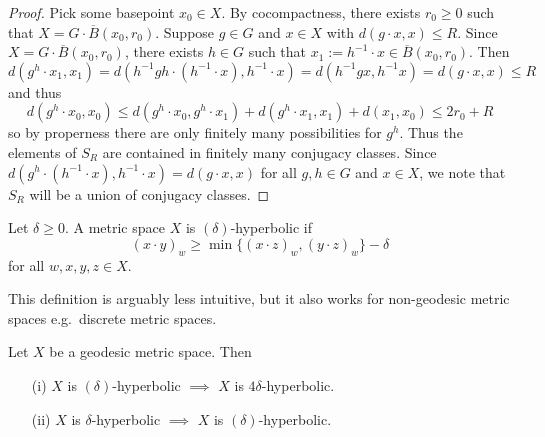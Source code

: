 \begin{proof}
    Pick some basepoint $x_0 \in X$.
    By cocompactness, there exists $r_0 \geq 0$ such that $X = G \cdot \overline{B}(x_0, r_0)$.
    Suppose $g \in G$ and $x \in X$ with $d(g \cdot x, x) \leq R$.
    Since $X = G \cdot \overline{B}(x_0, r_0)$, there exists $h \in G$ such that $x_1 := h^{-1} \cdot x \in \overline{B}(x_0, r_0)$.
    Then \[
        d(g^h \cdot x_1, x_1) = d(h^{-1} g h \cdot (h^{-1} \cdot x), h^{-1} \cdot x) = d(h^{-1} g x, h^{-1} x) = d(g \cdot x, x) \leq R
    \] and thus \[
        d(g^h \cdot x_0, x_0) \leq d(g^h \cdot x_0, g^h \cdot x_1) + d(g^h \cdot x_1, x_1) + d(x_1, x_0) \leq 2r_0 + R
    \] so by properness there are only finitely many possibilities for $g^h$.
    Thus the elements of $S_R$ are contained in finitely many conjugacy classes.
    Since $d(g^h \cdot (h^{-1} \cdot x), h^{-1} \cdot x) = d(g \cdot x, x)$ for all $g, h \in G$ and $x \in X$, we note that $S_R$ will be a union of conjugacy classes.


\end{proof}

\begin{definition}
    Let $\delta \geq 0$.
    A metric space $X$ is $(\delta)$-hyperbolic if
    \begin{equation}\label{equation:fourpoint}
        (x \cdot y)_w \geq \min\{ (x \cdot z)_w, (y \cdot z)_w \} - \delta \tag{$\ast$}
    \end{equation}
    for all $w, x, y, z \in X$.
\end{definition}

\begin{remark}
    This definition is arguably less intuitive, but it also works for non-geodesic metric spaces e.g.\ discrete metric spaces.
\end{remark}

\begin{proposition}
    \label{proposition:comparing_deltas}
    Let $X$ be a geodesic metric space.
    Then
    \begin{enumerate}
        \item[(i)] $X$ is $(\delta)$-hyperbolic $\implies$ $X$ is $4\delta$-hyperbolic.
        \item[(ii)] $X$ is $\delta$-hyperbolic $\implies$ $X$ is $(\delta)$-hyperbolic.
    \end{enumerate}
\end{proposition}

